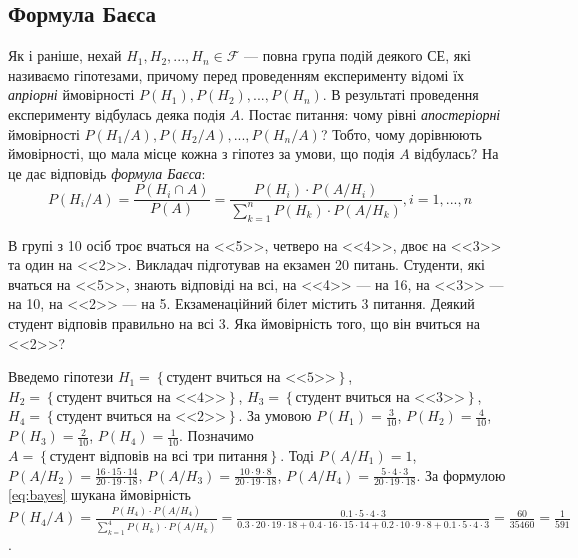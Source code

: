 \subsection{Формула Баєса}
Як і раніше, нехай $H_1, H_2, ..., H_n \in \mathcal{F}$ --- повна група подій деякого СЕ, які називаємо гіпотезами, причому
перед проведенням експерименту відомі їх \emph{апріорні} ймовірності $P(H_1), P(H_2), ..., P(H_n)$.
В результаті проведення експерименту відбулась деяка подія $A$.
Постає питання: чому рівні \emph{апостеріорні} ймовірності $P(H_1/A), P(H_2/A), ..., P(H_n/A)$?
Тобто, чому дорівнюють ймовірності, що мала місце кожна з гіпотез за умови, що подія $A$ відбулась? На це дає відповідь \emph{формула Баєса}:
\begin{equation}\label{eq:bayes}
    P(H_i/A) = \frac{P(H_i \cap A)}{P(A)} = \frac{P(H_i) \cdot P(A/H_i)}{\sum\limits_{k=1}^n P(H_k)\cdot P(A/H_k)}, i = 1,...,n
\end{equation}

\begin{example}
    В групі з 10 осіб троє вчаться на <<5>>, четверо на <<4>>, двоє на <<3>> та один на <<2>>.
    Викладач підготував на екзамен 20 питань. Студенти, які вчаться на <<5>>, знають відповіді на всі,
    на <<4>> --- на 16, на <<3>> --- на 10, на <<2>> --- на 5.
    Екзаменаційний білет містить 3 питання. Деякий студент відповів правильно на всі 3.
    Яка ймовірність того, що він вчиться на <<2>>?

    Введемо гіпотези $H_1 = \left\{ \text{студент вчиться на <<5>>}\right\}$, $H_2 = \left\{ \text{студент вчиться на <<4>>}\right\}$,
    $H_3 = \left\{ \text{студент вчиться на <<3>>}\right\}$, $H_4 = \left\{ \text{студент вчиться на <<2>>}\right\}$.
    За умовою $P(H_1) = \frac{3}{10}$, $P(H_2) = \frac{4}{10}$, $P(H_3) = \frac{2}{10}$, $P(H_4) = \frac{1}{10}$. 
    Позначимо $A = \left\{ \text{студент відповів на всі три питання}\right\}$. 
    Тоді $P(A/H_1) = 1$, $P(A/H_2) = \frac{16 \cdot 15 \cdot 14}{20 \cdot 19 \cdot 18}$, 
    $P(A/H_3) = \frac{10 \cdot 9 \cdot 8}{20 \cdot 19 \cdot 18}$, 
    $P(A/H_4) = \frac{5 \cdot 4 \cdot 3}{20 \cdot 19 \cdot 18}$.
    За формулою \eqref{eq:bayes} шукана ймовірність $P(H_4/A) = \frac{P(H_4) \cdot P(A/H_4)}{\sum\limits_{k=1}^4 P(H_k)\cdot P(A/H_k)} =
    \frac{0.1 \cdot 5 \cdot 4 \cdot 3}{0.3 \cdot 20 \cdot 19 \cdot 18 + 0.4 \cdot 16 \cdot 15 \cdot 14 + 0.2 \cdot 10 \cdot 9 \cdot 8 + 0.1 \cdot 5 \cdot 4 \cdot 3}
     = \frac{60}{35460} = \frac{1}{591}$.

\end{example}